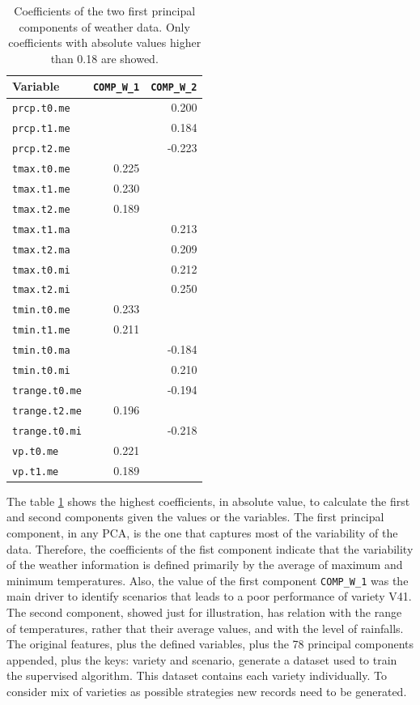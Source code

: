 \documentclass[syngen,nonblindrev]{informs3-syngen}
\begin{document}
\begin{table}
\begin{center}
\begin{tabular}{lrr}
\hline
Variable   & \texttt{COMP\_W\_1} & \texttt{COMP\_W\_2}   \\
\hline

\texttt{prcp.t0.me}  & &  0.200\\
\texttt{prcp.t1.me}  & & 0.184\\
\texttt{prcp.t2.me}  &  &-0.223\\
\texttt{tmax.t0.me}  &  0.225 &\\
\texttt{tmax.t1.me}  &  0.230 &\\
\texttt{tmax.t2.me} &  0.189&  \\
\texttt{tmax.t1.ma}  &  & 0.213\\
\texttt{tmax.t2.ma}  &   &0.209\\
\texttt{tmax.t0.mi}  & &  0.212\\
\texttt{tmax.t2.mi}  &  & 0.250\\
\texttt{tmin.t0.me}  &  0.233 &\\
\texttt{tmin.t1.me}  &  0.211&  \\
\texttt{tmin.t0.ma } &   &-0.184\\
\texttt{tmin.t0.mi } &  &  0.210\\
\texttt{trange.t0.me} & & -0.194\\
\texttt{trange.t2.me}  &0.196  & \\
\texttt{trange.t0.mi}&  &-0.218\\
\texttt{vp.t0.me   }  & 0.221 &\\
\texttt{vp.t1.me}    &  0.189 & \\

\hline
\end{tabular}
\end{center}
\caption{Coefficients of the two first principal components of weather data. \newline Only coefficients with absolute values higher than 0.18 are showed.}\label{pca}
\end{table}

The table \ref{pca} shows the highest coefficients, in absolute value, to calculate the first and second components given the values or the variables. 
The first principal component, in any PCA, is the one that captures most of the variability of the data.
Therefore, the coefficients of the fist component indicate that the variability of the weather information is defined primarily by the average of maximum and minimum temperatures. 
Also, the value of the first component \texttt{COMP\_W\_1} was the main driver to identify scenarios that leads to a poor performance of variety V41. 
The second component, showed just for illustration, has relation with the range of temperatures, rather that their average values, and with the level of rainfalls. 
The original features, plus the defined variables, plus the 78 principal components appended, plus the keys: variety and scenario, generate a dataset used to train the supervised algorithm.
This dataset contains each variety individually.
To consider mix of varieties as possible strategies new records need to be generated.
\end{document}

